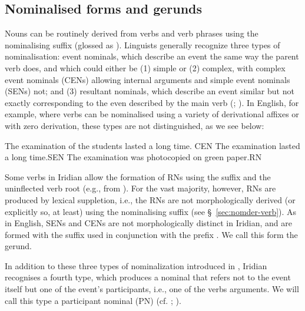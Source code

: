 \subsection{Nominalised forms and gerunds}\label{nom-morph}

Nouns can be routinely derived from verbs and verb phrases using the nominalising suffix  (glossed as \Nz{}). Linguists generally recognize three types of nominalisation: event nominals, which describe an event the same way the parent verb does, and which could either be (1) simple or (2) complex, with {\cscaps complex event nominals} (CENs) allowing internal arguments and {\cscaps simple event nominals} (SENs) not; and (3) {\cscaps resultant nominals}, which describe an event similar but not exactly corresponding to the even described by the main verb (\cite{grimshaw1990}; \cite{moulton2014}). In English, for example, where verbs can be nominalised using a variety of derivational affixes or with zero derivation, these types are not distinguished, as we see below:

\pex[interpartskip=0pt]
	\a The examination of the students lasted a long time. \hfill {CEN}
	\a The examination lasted a long time.\hfill {SEN}
	\a The examination was photocopied on green paper.\hfill {RN}\\
\xe

Some verbs in Iridian allow the formation of RNs using the suffix  and the uninflected verb root (e.g.,  from ). For the vast majority, however, RNs are produced by lexical suppletion, i.e., the RNs are not morphologically derived (or explicitly so, at least) using the nominalising suffix (see \S~\ref{sec:nomder-verb}). As in English, SENs and CENs are not morphologically distinct in Iridian, and are formed with the suffix  used in conjunction with the prefix . We call this form the {\cscaps gerund}.

In addition to these three types of nominalization introduced in \textcite{grimshaw1990}, Iridian recognises a fourth type, which produces a nominal that refers not to the event itself but one of the event's participants, i.e., one of the verbs arguments. We will call this type a {\cscaps participant nominal} (PN) (cf. \cite[400-5]{schackow2015}; \cite[297-8]{okuna}).

